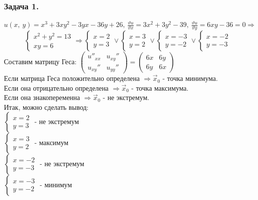 \documentclass[12pt, letterpaper, twoside]{article}
\begin{document}
    \subsubsection*{Задача 1.}
    $u(x,\ y) = x^3 + 3xy^2 - 3yx - 36y + 26,\ \frac{\vartheta u}{\vartheta x} = 3x^2 + 3y^2 - 39,\ \frac{\vartheta u}{\vartheta y} = 6xy - 36 = 0\Rightarrow$
    \[\begin{cases}
        x^2 + y^2  =13\\
        xy = 6
    \end{cases}\Rightarrow \begin{cases}
        x = 2\\
        y = 3
    \end{cases}\vee \begin{cases}
        x = 3\\
        y = 2
    \end{cases}\vee \begin{cases}
        x = -3\\
        y = -2
    \end{cases}\vee \begin{cases}
        x = -2\\
        y = -3
    \end{cases}\]
    Составим матрицу Геса: $\begin{pmatrix}
        u''_{xx} & u_{xy}''\\
        u_{xy}'' & u_{yy}''
    \end{pmatrix} = \begin{pmatrix}
        6x & 6y\\
        6y & 6x
    \end{pmatrix}$\\
    Если матрица Геса положительно определена $\Rightarrow \vec{x}_0$ - точка минимума.\\
    Если она отрицательно определена $\Rightarrow \vec{x}_0$ - точка максимума.\\
    Если она знакопеременна $\Rightarrow \vec{x}_0$ - не экстремум.\\
    Итак, можно сделать вывод:\\
    $\begin{cases}
        x = 2\\
        y = 3
    \end{cases}$ - не экстремум\\
    $\begin{cases}
        x = 3\\
        y = 2
    \end{cases}$ - максимум\\
    $\begin{cases}
        x = -2\\
        y = -3
    \end{cases}$ - не экстремум\\
    $\begin{cases}
        x = -3\\
        y = -2
    \end{cases}$ - минимум\\
\end{document}
